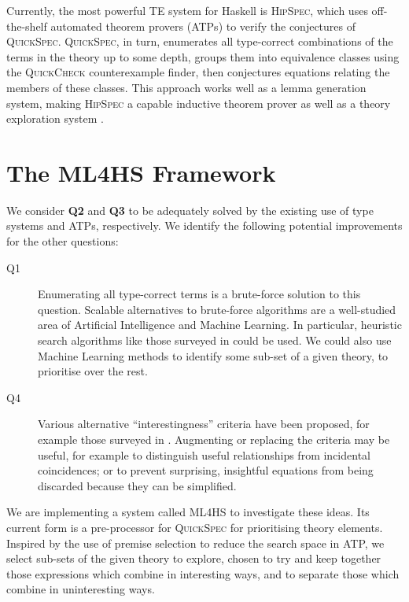 \documentclass{llncs}
\begin{document}
Currently, the most powerful TE system for Haskell is \textsc{HipSpec}, which
uses off-the-shelf automated theorem provers (ATPs) to verify the conjectures of
\textsc{QuickSpec}. \textsc{QuickSpec}, in turn, enumerates all type-correct combinations
of the terms in the theory up to some depth, groups them into equivalence
classes using the \textsc{QuickCheck} counterexample finder, then conjectures
equations relating the members of these classes. This approach works well as a
lemma generation system, making \textsc{HipSpec} a capable inductive theorem
prover as well as a theory exploration system \cite{claessen2013automating}.

\section{The \textsc{ML4HS} Framework}\label{ml4hs}

We consider \textbf{Q2} and \textbf{Q3} to be adequately solved by the existing
use of type systems and ATPs, respectively. We identify the following potential
improvements for the other questions:

\begin{description}
\item [Q1]
  Enumerating all type-correct terms is a brute-force solution to this question.
  Scalable alternatives to brute-force algorithms are a well-studied area of
  Artificial Intelligence and Machine Learning. In particular, heuristic
  search algorithms like those surveyed in \cite{blum2011hybrid} could be used.
  We could also use Machine Learning methods to identify some sub-set of a given
  theory, to prioritise over the rest.
\item [Q4]
  Various alternative ``interestingness'' criteria have been proposed, for
  example those surveyed in \cite{geng2006interestingness}. Augmenting or
  replacing the criteria may be useful, for example to distinguish useful
  relationships from incidental coincidences; or to prevent surprising,
  insightful equations from being discarded because they can be simplified.
\end{description}

We are implementing a system called \textsc{ML4HS} to investigate these ideas.
Its current form is a pre-processor for \textsc{QuickSpec} for prioritising
theory elements. Inspired by the use of premise selection
\cite{kuhlwein2012overview} to reduce the search space in ATP,
we select sub-sets of the given theory to explore, chosen to try and keep
together those expressions which combine in interesting ways, and to separate
those which combine in uninteresting ways.
\end{document}
